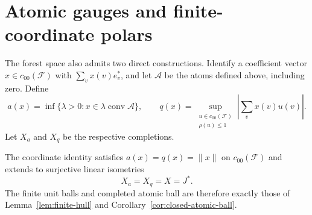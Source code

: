 \section{Atomic gauges and finite-coordinate polars}
\label{presentation:constructions}

The forest space also admits two direct constructions. Identify a
coefficient vector $x\in c_{00}(\mathcal F)$ with
$\sum_v x(v)e_v^*$, and let $\mathcal A$ be the atoms defined above,
including zero. Define
\[
 a(x)=\inf\{\lambda>0:x\in\lambda\operatorname{conv}\mathcal A\},
 \qquad
 q(x)=\sup_{\substack{u\in c_{00}(\mathcal F)\\\rho(u)\le1}}
       \left|\sum_v x(v)u(v)\right|.
\]
Let $X_a$ and $X_q$ be the respective completions.

\begin{proposition}\label{presentation:identity}
The coordinate identity satisfies $a(x)=q(x)=\|x\|$ on
$c_{00}(\mathcal F)$ and extends to surjective linear isometries
\[
 X_a=X_q=X=J^*.
\]
The finite unit balls and completed atomic ball are therefore exactly
those of Lemma~\ref{lem:finite-hull} and
Corollary~\ref{cor:closed-atomic-ball}.
\end{proposition}

